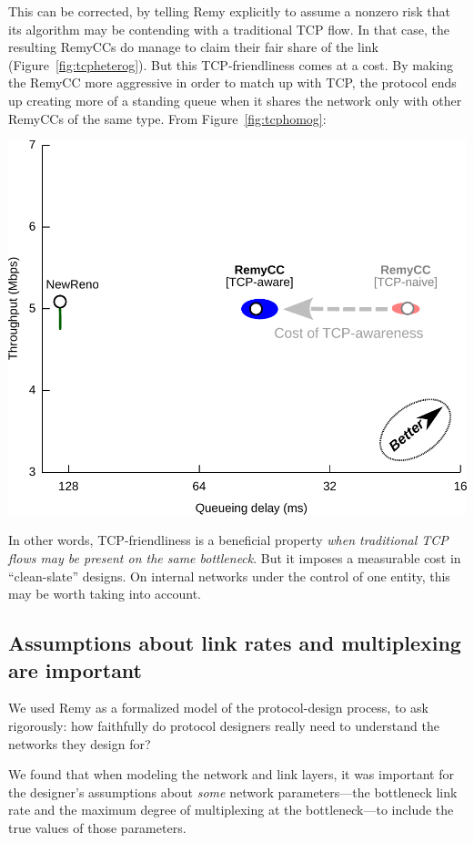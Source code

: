 This can be corrected, by telling Remy explicitly to assume a nonzero
risk that its algorithm may be contending with a traditional TCP
flow. In that case, the resulting RemyCCs do manage to claim their
fair share of the link (Figure~\ref{fig:tcpheterog}). But this
TCP-friendliness comes at a cost. By making the RemyCC more aggressive
in order to match up with TCP, the protocol ends up creating more
of a standing queue when it shares the network only
with other RemyCCs of the same type. From Figure~\ref{fig:tcphomog}:

\begin{center}
\includegraphics[width=0.75 \textwidth]{homo-3.pdf}
\end{center}

In other words, TCP-friendliness is a beneficial property \emph{when
  traditional TCP flows may be present on the same bottleneck}. But it
imposes a measurable cost in ``clean-slate'' designs. On internal networks
under the control of one entity, this may be worth taking into account.

\subsection{Assumptions about link rates and multiplexing are important}

We used Remy as a formalized model of the protocol-design process, to
ask rigorously: how faithfully do protocol designers really need to
understand the networks they design for?

We found that when modeling the network and link layers, it was
important for the designer's assumptions about \emph{some} network
parameters---the bottleneck link rate and the maximum degree of
multiplexing at the bottleneck---to include the true values of those
parameters.

